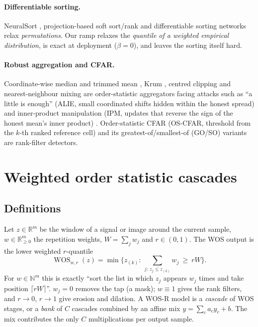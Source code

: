 \documentclass[11pt,a4paper]{article}
\theoremstyle{definition}
\theoremstyle{remark}
\newcommand{\WOS}{\operatorname{WOS}}
\newcommand{\R}{\mathbb{R}}
\begin{document}
\paragraph{Differentiable sorting.} NeuralSort \cite{grover2019}, projection-based soft sort/rank \cite{blondel2020} and
differentiable sorting networks \cite{petersen2021} relax \emph{permutations}. Our ramp relaxes the \emph{quantile of a
weighted empirical distribution}, is exact at deployment ($\beta=0$), and leaves the sorting itself hard.
\paragraph{Robust aggregation and CFAR.} Coordinate-wise median and trimmed mean \cite{yin2018byz}, Krum
\cite{blanchard2017}, centred clipping \cite{karimireddy2021} and nearest-neighbour mixing \cite{allouah2023} are
order-statistic aggregators facing attacks such as ``a little is enough'' (ALIE, small coordinated shifts hidden within
the honest spread) \cite{baruch2019} and inner-product manipulation (IPM, updates that reverse the sign of the honest
mean's inner product) \cite{xie2019ipm}. Order-statistic CFAR (OS-CFAR, threshold from the $k$-th ranked reference cell)
\cite{rohling1983} and its greatest-of/smallest-of (GO/SO) variants \cite{gandhi1988} are rank-filter detectors.

\section{Weighted order statistic cascades}\label{sec:wos}
\subsection{Definitions}
Let $z\in\R^m$ be the window of a signal or image around the current sample, $w\in\R_{\ge0}^m$ the repetition weights,
$W=\sum_jw_j$ and $r\in(0,1)$. The WOS output is the lower weighted $r$-quantile
\begin{equation}\label{eq:wos}
\WOS_{w,r}(z)=\min\Big\{z_{(k)}:\ \textstyle\sum_{j:\,z_j\le z_{(k)}}w_j\ \ge\ rW\Big\}.
\end{equation}
For $w\in\mathbb N^m$ this is exactly ``sort the list in which $z_j$ appears $w_j$ times and take position $\lceil rW\rceil$''.
$w_j=0$ removes the tap (a mask); $w\equiv1$ gives the rank filters, and $r\to0$, $r\to1$ give erosion and dilation.
A WOS-R model is a \emph{cascade} of WOS stages, or a \emph{bank} of $C$ cascades combined by an affine mix
$y=\sum_c a_cy_c+b$. The mix contributes the only $C$ multiplications per output sample.
\end{document}
